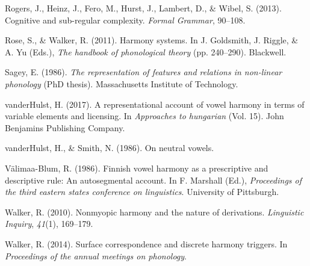 \documentclass[,doc,floatsintext]{apa6}
\theoremstyle{definition}
\theoremstyle{definition}
\theoremstyle{definition}
\theoremstyle{remark}
\begin{document}
\hypertarget{ref-rogersetal2013}{}
Rogers, J., Heinz, J., Fero, M., Hurst, J., Lambert, D., \& Wibel, S.
(2013). Cognitive and sub-regular complexity. \emph{Formal Grammar},
90--108.

\hypertarget{ref-rosewalker2011}{}
Rose, S., \& Walker, R. (2011). Harmony systems. In J. Goldsmith, J.
Riggle, \& A. Yu (Eds.), \emph{The handbook of phonological theory} (pp.
240--290). Blackwell.

\hypertarget{ref-sagey1986}{}
Sagey, E. (1986). \emph{The representation of features and relations in
non-linear phonology} (PhD thesis). Massachusetts Institute of
Technology.

\hypertarget{ref-vdHulst2017}{}
vanderHulst, H. (2017). A representational account of vowel harmony in
terms of variable elements and licensing. In \emph{Approaches to
hungarian} (Vol. 15). John Benjamins Publishing Company.

\hypertarget{ref-vdHulstSmith1986}{}
vanderHulst, H., \& Smith, N. (1986). On neutral vowels.

\hypertarget{ref-valimaablum1986}{}
Välimaa-Blum, R. (1986). Finnish vowel harmony as a prescriptive and
descriptive rule: An autosegmental account. In F. Marshall (Ed.),
\emph{Proceedings of the third eastern states conference on
linguistics}. University of Pittsburgh.

\hypertarget{ref-walker2010}{}
Walker, R. (2010). Nonmyopic harmony and the nature of derivations.
\emph{Linguistic Inquiry}, \emph{41}(1), 169--179.

\hypertarget{ref-walker2014}{}
Walker, R. (2014). Surface correspondence and discrete harmony triggers.
In \emph{Proceedings of the annual meetings on phonology}.
\end{document}
